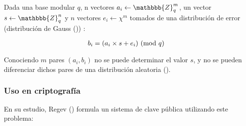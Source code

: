 Dada una base modular $q$, n vectores $a_i \leftarrow \mathbbb{Z}^m_q$, un vector $s \leftarrow \mathbbb{Z}^n_q$ y $n$ vectores $ e_i \leftarrow \chi{}^m $ tomados de una distribución de error (distribución de Gauss (\cite{wikipedia_contributors._generalized_2019})) \chi{} \subset{} :

\begin{gather}
    \label{form:gen_lwe}
    b_i = (a_i \times s + e_i) \ (\mathrm{mod}\ q)
\end{gather}

Conociendo $m$ pares $(a_i, b_i)$ no se puede determinar el valor $s$, y no se pueden diferenciar dichos pares de una distribución aleatoria (\cite{zijlstra_learning_nodate}).

\subsubsection{Uso en criptografía}

En su estudio, Regev (\cite{regev_learning_2010}) formula un sistema de clave pública utilizando este problema:

